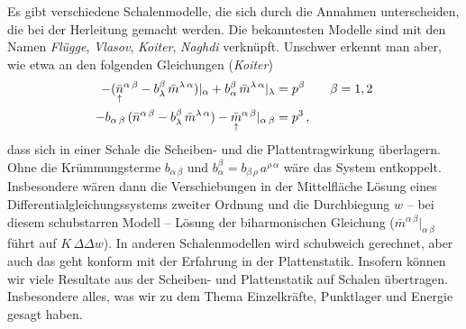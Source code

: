 Es gibt verschiedene Schalenmodelle, die sich durch die Annahmen unterscheiden, die bei der Herleitung gemacht werden. Die bekanntesten Modelle sind mit den Namen {\em Fl\"{u}gge\/}, {\em Vlasov\/}, {\em Koiter\/}, {\em Naghdi\/} verkn\"{u}pft. Unschwer erkennt man aber, wie etwa an den folgenden Gleichungen ({\em Koiter\/})
\begin{align}\label{Koiter}
- (\underset{\uparrow}{\bar{n}}^{\alpha\,\beta} -
b_\lambda^\beta\,\bar{m}^{\lambda\,\alpha})|_\alpha +
b^\beta_\alpha\,\bar{m}^{\lambda\,\alpha}|_\lambda &= p^\beta \qquad \beta = 1,2 \nonumber \\
- b_{\alpha\,\beta}\,(\bar{n}^{\alpha\,\beta} -
b_\lambda^\beta\,\bar{m}^{\lambda\,\alpha}) -
\underset{\uparrow}{\bar{m}}^{\alpha\,\beta}|_{\alpha\,\beta} &= p^3\,,
\end{align}
dass sich in einer Schale die Scheiben- und die Plattentragwirkung \"{u}berlagern. Ohne die Kr\"{u}mmungsterme $b_{\alpha\,\beta}$ und $b_\alpha^\beta = b_{\beta\,\rho}\,a^{\rho\,\alpha}$ w\"{a}re das System entkoppelt. Insbesondere w\"{a}ren dann die Verschiebungen in der Mittelfl\"{a}che L\"{o}sung eines Differentialgleichungssystems zweiter Ordnung und die Durchbiegung $w$ -- bei diesem schubstarren Modell -- L\"{o}sung der biharmonischen Gleichung (${\bar{m}}^{\alpha\,\beta}|_{\alpha\,\beta}$ f\"{u}hrt auf $K\,\Delta \Delta w$). In anderen Schalenmodellen wird schubweich gerechnet, aber auch das geht konform mit der Erfahrung in der Plattenstatik. Insofern k\"{o}nnen wir viele Resultate aus der Scheiben- und Plattenstatik auf Schalen \"{u}bertragen. Insbesondere alles, was wir zu dem Thema Einzelkr\"{a}fte, Punktlager und Energie gesagt haben.

